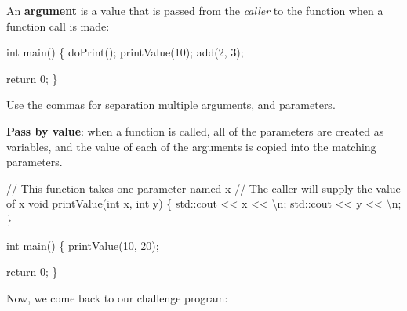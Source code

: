 \documentclass[
  letterpaper,
  DIV=11,
  numbers=noendperiod]{scrreprt}
\newenvironment{Shaded}{\begin{snugshade}}{\end{snugshade}}
\newcommand{\ControlFlowTok}[1]{\textcolor[rgb]{0.00,0.23,0.31}{#1}}
\newcommand{\DecValTok}[1]{\textcolor[rgb]{0.68,0.00,0.00}{#1}}
\newcommand{\ErrorTok}[1]{\textcolor[rgb]{0.68,0.00,0.00}{#1}}
\newcommand{\FunctionTok}[1]{\textcolor[rgb]{0.28,0.35,0.67}{#1}}
\newcommand{\NormalTok}[1]{\textcolor[rgb]{0.00,0.23,0.31}{#1}}
\newcommand{\SpecialCharTok}[1]{\textcolor[rgb]{0.37,0.37,0.37}{#1}}
\newcommand{\StringTok}[1]{\textcolor[rgb]{0.13,0.47,0.30}{#1}}
\begin{document}
An \textbf{argument} is a value that is passed from the \emph{caller} to
the function when a function call is made:

\begin{Shaded}
\begin{Highlighting}[]
\NormalTok{int }\FunctionTok{main}\NormalTok{()}
\NormalTok{\{}
    \FunctionTok{doPrint}\NormalTok{();}
    \FunctionTok{printValue}\NormalTok{(}\DecValTok{10}\NormalTok{);}
    \FunctionTok{add}\NormalTok{(}\DecValTok{2}\NormalTok{, }\DecValTok{3}\NormalTok{);}

\NormalTok{    return }\DecValTok{0}\NormalTok{;}
\NormalTok{\}}
\end{Highlighting}
\end{Shaded}

Use the commas for separation multiple arguments, and parameters.

\textbf{Pass by value}: when a function is called, all of the parameters
are created as variables, and the value of each of the arguments is
copied into the matching parameters.

\begin{Shaded}
\begin{Highlighting}[]
\SpecialCharTok{/}\ErrorTok{/}\NormalTok{ This }\ControlFlowTok{function}\NormalTok{ takes one parameter named x}
\SpecialCharTok{/}\ErrorTok{/}\NormalTok{ The caller will supply the value of x}
\NormalTok{void }\FunctionTok{printValue}\NormalTok{(int x, int y)}
\NormalTok{\{}
\NormalTok{    std}\SpecialCharTok{::}\NormalTok{cout }\SpecialCharTok{\textless{}}\ErrorTok{\textless{}}\NormalTok{ x }\SpecialCharTok{\textless{}}\ErrorTok{\textless{}} \StringTok{\textquotesingle{}}\SpecialCharTok{\textbackslash{}n}\StringTok{\textquotesingle{}}\NormalTok{;}
\NormalTok{    std}\SpecialCharTok{::}\NormalTok{cout }\SpecialCharTok{\textless{}}\ErrorTok{\textless{}}\NormalTok{ y }\SpecialCharTok{\textless{}}\ErrorTok{\textless{}} \StringTok{\textquotesingle{}}\SpecialCharTok{\textbackslash{}n}\StringTok{\textquotesingle{}}\NormalTok{;}
\NormalTok{\}}

\NormalTok{int }\FunctionTok{main}\NormalTok{()}
\NormalTok{\{}
    \FunctionTok{printValue}\NormalTok{(}\DecValTok{10}\NormalTok{, }\DecValTok{20}\NormalTok{);}

\NormalTok{    return }\DecValTok{0}\NormalTok{;}
\NormalTok{\}}
\end{Highlighting}
\end{Shaded}

Now, we come back to our challenge program:
\end{document}
